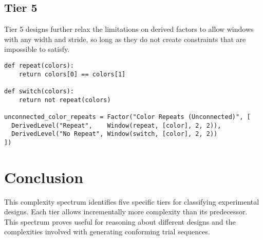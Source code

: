 \subsection{Tier 5}

Tier 5 designs further relax the limitations on derived factors to allow windows with any width and stride, so long as they do not create constraints that are impossible to satisfy.

\begin{verbatim}
def repeat(colors):
    return colors[0] == colors[1]

def switch(colors):
    return not repeat(colors)

unconnected_color_repeats = Factor("Color Repeats (Unconnected)", [
  DerivedLevel("Repeat",    Window(repeat, [color], 2, 2)),
  DerivedLevel("No Repeat", Window(switch, [color], 2, 2))
])
\end{verbatim}

\section{Conclusion}

This complexity spectrum identifies five specific tiers for classifying experimental designs. Each tier allows incrementally more complexity than its predecessor. This spectrum proves useful for reasoning about different designs and the complexities involved with generating conforming trial sequences.
